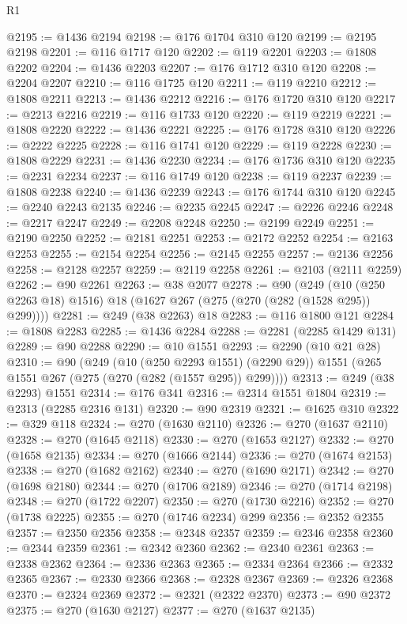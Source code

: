\begin{lexlean}{R1}
\begin{coremodule}
@2195 := @1436 @2194
@2198 := @176 @1704 @310 @120
@2199 := @2195 @2198
@2201 := @116 @1717 @120
@2202 := @119 @2201
@2203 := @1808 @2202
@2204 := @1436 @2203
@2207 := @176 @1712 @310 @120
@2208 := @2204 @2207
@2210 := @116 @1725 @120
@2211 := @119 @2210
@2212 := @1808 @2211
@2213 := @1436 @2212
@2216 := @176 @1720 @310 @120
@2217 := @2213 @2216
@2219 := @116 @1733 @120
@2220 := @119 @2219
@2221 := @1808 @2220
@2222 := @1436 @2221
@2225 := @176 @1728 @310 @120
@2226 := @2222 @2225
@2228 := @116 @1741 @120
@2229 := @119 @2228
@2230 := @1808 @2229
@2231 := @1436 @2230
@2234 := @176 @1736 @310 @120
@2235 := @2231 @2234
@2237 := @116 @1749 @120
@2238 := @119 @2237
@2239 := @1808 @2238
@2240 := @1436 @2239
@2243 := @176 @1744 @310 @120
@2245 := @2240 @2243 @2135
@2246 := @2235 @2245
@2247 := @2226 @2246
@2248 := @2217 @2247
@2249 := @2208 @2248
@2250 := @2199 @2249
@2251 := @2190 @2250
@2252 := @2181 @2251
@2253 := @2172 @2252
@2254 := @2163 @2253
@2255 := @2154 @2254
@2256 := @2145 @2255
@2257 := @2136 @2256
@2258 := @2128 @2257
@2259 := @2119 @2258
@2261 := @2103 (@2111 @2259)
@2262 := @90 @2261
@2263 := @38 @2077
@2278 := @90
    (@249 (@10 (@250 @2263 @18) @1516) @18 (@1627 @267 (@275 (@270 (@282 (@1528 @295)) @299))))
@2281 := @249 (@38 @2263) @18
@2283 := @116 @1800 @121
@2284 := @1808 @2283
@2285 := @1436 @2284
@2288 := @2281 (@2285 @1429 @131)
@2289 := @90 @2288
@2290 := @10 @1551
@2293 := @2290 (@10 @21 @28)
@2310 := @90
    (@249
      (@10 (@250 @2293 @1551) (@2290 @29))
      @1551
      (@265 @1551 @267 (@275 (@270 (@282 (@1557 @295)) @299))))
@2313 := @249 (@38 @2293) @1551
@2314 := @176 @341
@2316 := @2314 @1551 @1804
@2319 := @2313 (@2285 @2316 @131)
@2320 := @90 @2319
@2321 := @1625 @310
@2322 := @329 @118
@2324 := @270 (@1630 @2110)
@2326 := @270 (@1637 @2110)
@2328 := @270 (@1645 @2118)
@2330 := @270 (@1653 @2127)
@2332 := @270 (@1658 @2135)
@2334 := @270 (@1666 @2144)
@2336 := @270 (@1674 @2153)
@2338 := @270 (@1682 @2162)
@2340 := @270 (@1690 @2171)
@2342 := @270 (@1698 @2180)
@2344 := @270 (@1706 @2189)
@2346 := @270 (@1714 @2198)
@2348 := @270 (@1722 @2207)
@2350 := @270 (@1730 @2216)
@2352 := @270 (@1738 @2225)
@2355 := @270 (@1746 @2234) @299
@2356 := @2352 @2355
@2357 := @2350 @2356
@2358 := @2348 @2357
@2359 := @2346 @2358
@2360 := @2344 @2359
@2361 := @2342 @2360
@2362 := @2340 @2361
@2363 := @2338 @2362
@2364 := @2336 @2363
@2365 := @2334 @2364
@2366 := @2332 @2365
@2367 := @2330 @2366
@2368 := @2328 @2367
@2369 := @2326 @2368
@2370 := @2324 @2369
@2372 := @2321 (@2322 @2370)
@2373 := @90 @2372
@2375 := @270 (@1630 @2127)
@2377 := @270 (@1637 @2135)

\end{coremodule}
\end{lexlean}
